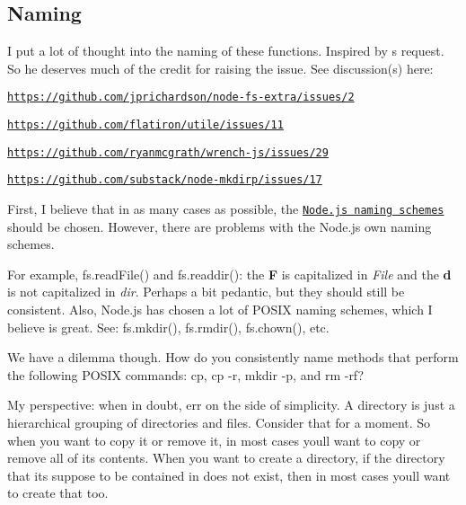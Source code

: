 \subsection*{Naming }

I put a lot of thought into the naming of these functions. Inspired by \textquotesingle{}s request. So he deserves much of the credit for raising the issue. See discussion(s) here\+:


\begin{DoxyItemize}
\item \href{https://github.com/jprichardson/node-fs-extra/issues/2}{\tt https\+://github.\+com/jprichardson/node-\/fs-\/extra/issues/2}
\item \href{https://github.com/flatiron/utile/issues/11}{\tt https\+://github.\+com/flatiron/utile/issues/11}
\item \href{https://github.com/ryanmcgrath/wrench-js/issues/29}{\tt https\+://github.\+com/ryanmcgrath/wrench-\/js/issues/29}
\item \href{https://github.com/substack/node-mkdirp/issues/17}{\tt https\+://github.\+com/substack/node-\/mkdirp/issues/17}
\end{DoxyItemize}

First, I believe that in as many cases as possible, the \href{http://nodejs.org/api/fs.html}{\tt Node.\+js naming schemes} should be chosen. However, there are problems with the Node.\+js own naming schemes.

For example, {\ttfamily fs.\+read\+File()} and {\ttfamily fs.\+readdir()}\+: the {\bfseries F} is capitalized in {\itshape File} and the {\bfseries d} is not capitalized in {\itshape dir}. Perhaps a bit pedantic, but they should still be consistent. Also, Node.\+js has chosen a lot of P\+O\+S\+IX naming schemes, which I believe is great. See\+: {\ttfamily fs.\+mkdir()}, {\ttfamily fs.\+rmdir()}, {\ttfamily fs.\+chown()}, etc.

We have a dilemma though. How do you consistently name methods that perform the following P\+O\+S\+IX commands\+: {\ttfamily cp}, {\ttfamily cp -\/r}, {\ttfamily mkdir -\/p}, and {\ttfamily rm -\/rf}?

My perspective\+: when in doubt, err on the side of simplicity. A directory is just a hierarchical grouping of directories and files. Consider that for a moment. So when you want to copy it or remove it, in most cases you\textquotesingle{}ll want to copy or remove all of its contents. When you want to create a directory, if the directory that it\textquotesingle{}s suppose to be contained in does not exist, then in most cases you\textquotesingle{}ll want to create that too.

